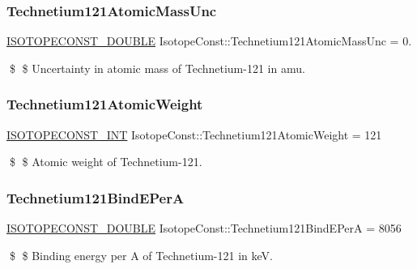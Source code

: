 \subsubsection{\texorpdfstring{Technetium121\+Atomic\+Mass\+Unc}{Technetium121AtomicMassUnc}}
{\footnotesize\ttfamily \mbox{\hyperlink{group___isotope_const-_macros_ga8f45a7272ce02c0b4c65c44636ed719a}{I\+S\+O\+T\+O\+P\+E\+C\+O\+N\+S\+T\+\_\+\+D\+O\+U\+B\+LE}} Isotope\+Const\+::\+Technetium121\+Atomic\+Mass\+Unc = 0.}

\$ \$ Uncertainty in atomic mass of Technetium-\/121 in amu. \mbox{\label{group___isotope_const-_technetium-_tc121_gae6f9afdb5edf36ad4dd1d2d959d34924}} 
\subsubsection{\texorpdfstring{Technetium121\+Atomic\+Weight}{Technetium121AtomicWeight}}
{\footnotesize\ttfamily \mbox{\hyperlink{group___isotope_const-_macros_ga5f18360b3e99483a35c32d789e62621c}{I\+S\+O\+T\+O\+P\+E\+C\+O\+N\+S\+T\+\_\+\+I\+NT}} Isotope\+Const\+::\+Technetium121\+Atomic\+Weight = 121}

\$ \$ Atomic weight of Technetium-\/121. \mbox{\label{group___isotope_const-_technetium-_tc121_gafc4e0083eff4c672e1495c38c741bf5c}} 
\subsubsection{\texorpdfstring{Technetium121\+Bind\+E\+PerA}{Technetium121BindEPerA}}
{\footnotesize\ttfamily \mbox{\hyperlink{group___isotope_const-_macros_ga8f45a7272ce02c0b4c65c44636ed719a}{I\+S\+O\+T\+O\+P\+E\+C\+O\+N\+S\+T\+\_\+\+D\+O\+U\+B\+LE}} Isotope\+Const\+::\+Technetium121\+Bind\+E\+PerA = 8056}

\$ \$ Binding energy per A of Technetium-\/121 in keV. \mbox{\label{group___isotope_const-_technetium-_tc121_gaee218535d117d01711082ef20d7131f5}} 
